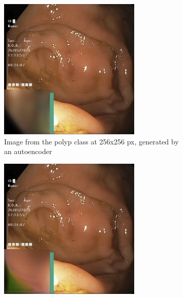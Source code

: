     \begin{figure}[t]
        \centering
        \begin{subfigure}[b]{0.4\textwidth}
            \centering
            \includegraphics[width=\textwidth]{experiments/figures/greensquare/normalmissAE.png}
            \caption[Is this in use]%
            {{\small Image from the polyp class at 256x256 px, generated by an autoencoder }}    
            \label{fig:polypAEGREEN}
        \end{subfigure}
        \qquad
        \begin{subfigure}[b]{0.4\textwidth}  
            \centering 
            \includegraphics[width=\textwidth]{experiments/figures/greensquare/normalmissGAN.png}

\end{subfigure}
\end{figure}
